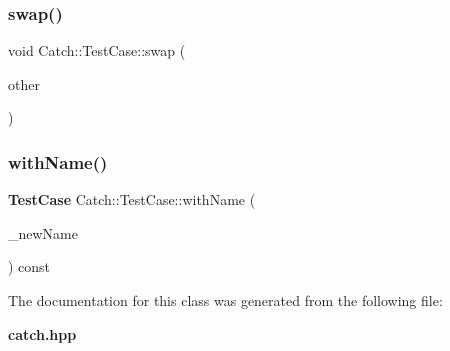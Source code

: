 \mbox{\label{class_catch_1_1_test_case_aee38f908faf10b905b209ca388275413}} 
\subsubsection{swap()}
{\footnotesize\ttfamily void Catch\+::\+Test\+Case\+::swap (\begin{DoxyParamCaption}\item[{\textbf{ Test\+Case} \&}]{other }\end{DoxyParamCaption})}

\mbox{\label{class_catch_1_1_test_case_a0812e8a216d09b087d5874687009f0d6}} 
\subsubsection{with\+Name()}
{\footnotesize\ttfamily \textbf{ Test\+Case} Catch\+::\+Test\+Case\+::with\+Name (\begin{DoxyParamCaption}\item[{std\+::string const \&}]{\+\_\+new\+Name }\end{DoxyParamCaption}) const}



The documentation for this class was generated from the following file\+:\begin{DoxyCompactItemize}
\item 
\textbf{ catch.\+hpp}\end{DoxyCompactItemize}

